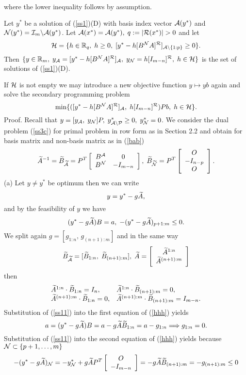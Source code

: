 where the lower inequality follows by assumption.
%
\par
%
\begin{theorem} \label{sss10}
Let $y^*$ be a solution of (\ref{ss1})(D) with basis index vector $\A(y^*)$ and
$\N(y^*) = \I_m \backslash \A(y^*)$.  Let $\A(x^*) = \A(y^*), \; q := |\R(x^*)|
> 0$ and let
\[
{\cal H} = \{h \in \Bbb{R}_q, \; h \geq 0, \; [y^* - h[B^{\N}A]^{\R}]_{\A
\backslash \{1:p\}} \geq 0\}.
\]
Then $\{y \in \Bbb{R}_m, \; y_{\A} = [y^* - h[B^{\N}A]^{\R}]_{\A}, \; y_{\N}
= h[I_{m-n}]^{\R}, \; h \in {\cal H}\}$ is the set of
solutions of (\ref{ss1})(D).
\end{theorem}
%
If ${\cal H}$ is not empty we may introduce a new objective function $y
\mapsto yb$ again and solve the secondary programming problem
\[
\min \{([y^* - h[B^{\N}A]^{\R}]_{\A}, \; h[I_{m-n}]^{\R})Pb, \; h \in
{\cal H}\}.
\]
Proof. Recall that $y = [y_{\A}, \; y_{\N}]P, \; y^*_{\A \backslash \P} \geq 0,
\; y^*_{\N} = 0$. We consider the dual problem (\ref{ss3c}) for primal
problem in row form as in Section 2.2 and obtain for basis matrix and non-basis
matrix as in  (\ref{bab})
\[
\wi{A}^{-1} = \wi{B}_{\wi{\A}} = P^T\ba{[}{cc} B^{\A} & 0\\B^{\N} & -
I_{m-n}\ea{]}, \;
\wi{B}_{\wi{\N}} = P^T \ba{[}{c} O \\- I_{n-p}\\ O \ea{]}.
\]
(a) Let $y \neq y^*$ be optimum then we can write
\begin{equation} \label{ss11}
y = y^* - g\wi{A},
\end{equation}
and by the feasibility of $y$ we have
\begin{equation} \label{hhh}
(y^* - g\wi{A})B = a, \; - (y^* - g\wi{A})_{p+1:m} \leq 0.
\end{equation}
We split again $g = [g_{1:n}, \, g_{(n+1):m}]$ and
in the same way
\[
\wi{B}_{\wi{\A}} = [\wi{B}_{1:n}, \; \wi{B}_{(n+1):m}], \; \wi{A} =
\ba{[}{c}\wi{A}^{1:n}\\
\wi{A}^{(n+1):m}\ea{]}
\]
then
\[ \ba{.}{ll}
\wi{A}^{1:n} \cdot \wi{B}_{1:n} = I_n, &
\wi{A}^{1:n} \cdot \wi{B}_{(n+1):m} = 0,\\
\wi{A}^{(n+1):m} \cdot \wi{B}_{1:n} = 0, &
\wi{A}^{(n+1):m} \cdot \wi{B}_{(n+1):m} = I_{m-n}.
\ea{.}
\]
Substitution of (\ref{ss11}) into the first equation of (\ref{hhh}) yields
\[
a = (y^* - g\wi{A})B = a - g\wi{A}\wi{B}_{1:n} = a - g_{1:n}
\Longrightarrow g_{1:n} = 0.
\]
Substitution of (\ref{ss11}) into the second equation of (\ref{hhh}) yields
because $\N \subset \{p+1, \ldots, m\}$
\[
- (y^* - g\wi{A})_{\N} = - y^*_{\N} + g\wi{A}P^T\ba{[}{c}O \\ -I_{m-n}\ea{]}
= -g\wi{A}\wi{B}_{(n+1):m} = - g_{(n+1):m} \leq 0
\]
